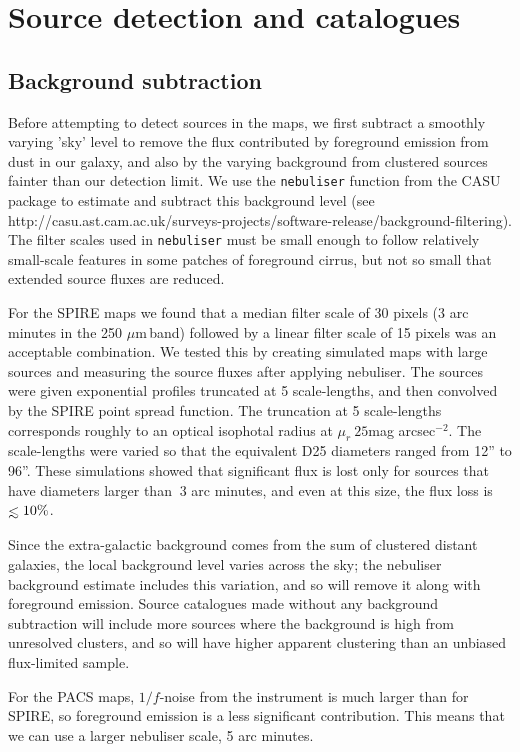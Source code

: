 \documentclass[useAMS,usenatbib]{mn2e}
\def\lesssim{\mathrel{\hbox{\rlap{\hbox{\lower4pt\hbox{$\sim$}}}\hbox{$<$}}}}
\def\mic{ $\mu $m\,}
\begin{document}
 

\section{ Source detection and catalogues } 

\subsection{Background subtraction} 

Before attempting to detect sources in the maps, we first subtract a
smoothly varying 'sky' level to remove the flux contributed by
foreground emission from dust in our galaxy, and also by the varying
background from clustered sources fainter than our detection limit. We
use the {\tt nebuliser} function from the CASU package to estimate and
subtract this background level (see
http://casu.ast.cam.ac.uk/surveys-projects/software-release/background-filtering). The
filter scales used in {\tt nebuliser} must be small enough to follow
relatively small-scale features in some patches of foreground cirrus,
but not so small that extended source fluxes are reduced.


For the SPIRE maps we found that a median filter scale of 30 pixels (3
arc minutes in the 250 \mic band) followed by a linear filter scale of
15 pixels was an acceptable combination. We tested this by creating
simulated maps with large sources and measuring the source fluxes
after applying nebuliser. The sources were given exponential profiles
truncated at 5 scale-lengths, and then convolved by the SPIRE point
spread function.  The truncation at 5 scale-lengths corresponds
roughly to an optical isophotal radius at $\mu_r ~ 25 $mag
arcsec$^{-2}$. The scale-lengths were varied so that the equivalent D25
diameters ranged from 12'' to 96''.
These simulations showed that significant flux is lost only for
sources that have diameters larger than $~3$ arc minutes, and even at
this size, the flux loss is $\lesssim 10\%$.

Since the extra-galactic background comes from the sum of clustered
distant galaxies, the local background level varies across the sky;
the nebuliser background estimate includes this variation, and so will
remove it along with foreground emission. Source catalogues made
without any background subtraction will include more sources where the
background is high from unresolved clusters, and so will have higher
apparent clustering than an unbiased flux-limited sample. 

For the PACS maps, $1/f$-noise from the instrument is much larger than
for SPIRE, so foreground emission is a less significant
contribution. This means that we can use a larger nebuliser scale, 5
arc minutes.
\end{document}
